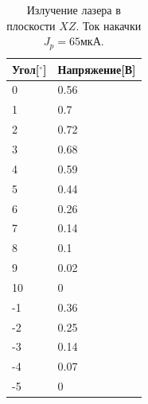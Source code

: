 \documentclass[a4paper, 12pt]{extarticle}
\begin{document}
\begin{table}
\begin{center}
    

\begin{tabular}{|l|l|}
    \hline
    Угол[$^{\circ}$]&Напряжение[В]\\
    \hline
0&0.56\\
1&0.7\\
2&0.72\\
3&0.68\\
4&0.59\\
5&0.44\\
6&0.26\\
7&0.14\\
8&0.1\\
9&0.02\\
10&0\\
-1&0.36\\
-2&0.25\\
-3&0.14\\
-4&0.07\\
-5&0\\
\hline
\end{tabular}

\end{center}
\caption{Излучение лазера в плоскости $XZ$. Ток накачки $J_p = 65\text{мкА}$.}
\label{tab:XZ_65}
\end{table}
\end{document}
